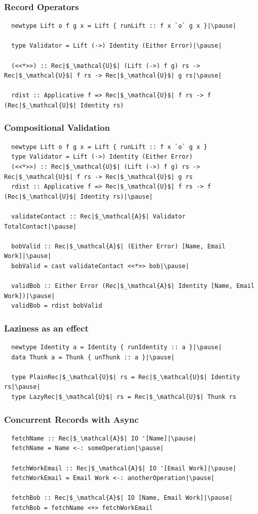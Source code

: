 \documentclass[tikz, 12pt]{beamer}
\begin{document}
\begin{frame}[fragile]
  \frametitle{Record Operators}\pause

  \begin{lstlisting}
  newtype Lift o f g x = Lift { runLift :: f x `o` g x }|\pause|

  type Validator = Lift (->) Identity (Either Error)|\pause|

  (<<*>>) :: Rec|$_\mathcal{U}$| (Lift (->) f g) rs -> Rec|$_\mathcal{U}$| f rs -> Rec|$_\mathcal{U}$| g rs|\pause|

  rdist :: Applicative f => Rec|$_\mathcal{U}$| f rs -> f (Rec|$_\mathcal{U}$| Identity rs)
  \end{lstlisting}
\end{frame}

\begin{frame}[fragile]
  \frametitle{Compositional Validation}

  \begin{lstlisting}
  newtype Lift o f g x = Lift { runLift :: f x `o` g x }
  type Validator = Lift (->) Identity (Either Error)
  (<<*>>) :: Rec|$_\mathcal{U}$| (Lift (->) f g) rs -> Rec|$_\mathcal{U}$| f rs -> Rec|$_\mathcal{U}$| g rs
  rdist :: Applicative f => Rec|$_\mathcal{U}$| f rs -> f (Rec|$_\mathcal{U}$| Identity rs)|\pause|

  validateContact :: Rec|$_\mathcal{A}$| Validator TotalContact|\pause|

  bobValid :: Rec|$_\mathcal{A}$| (Either Error) [Name, Email Work]|\pause|
  bobValid = cast validateContact <<*>> bob|\pause|

  validBob :: Either Error (Rec|$_\mathcal{A}$| Identity [Name, Email Work])|\pause|
  validBob = rdist bobValid
  \end{lstlisting}
\end{frame}

\begin{frame}[fragile]
  \frametitle{Laziness as an effect}\pause

  \begin{lstlisting}
  newtype Identity a = Identity { runIdentity :: a }|\pause|
  data Thunk a = Thunk { unThunk :: a }|\pause|

  type PlainRec|$_\mathcal{U}$| rs = Rec|$_\mathcal{U}$| Identity rs|\pause|
  type LazyRec|$_\mathcal{U}$| rs = Rec|$_\mathcal{U}$| Thunk rs
  \end{lstlisting}
\end{frame}

\begin{frame}[fragile]
  \frametitle{Concurrent Records with Async}\pause

  \begin{lstlisting}
  fetchName :: Rec|$_\mathcal{A}$| IO '[Name]|\pause|
  fetchName = Name <-: someOperation|\pause|

  fetchWorkEmail :: Rec|$_\mathcal{A}$| IO '[Email Work]|\pause|
  fetchWorkEmail = Email Work <-: anotherOperation|\pause|

  fetchBob :: Rec|$_\mathcal{A}$| IO [Name, Email Work]|\pause|
  fetchBob = fetchName <+> fetchWorkEmail
  \end{lstlisting}
\end{frame}
\end{document}
